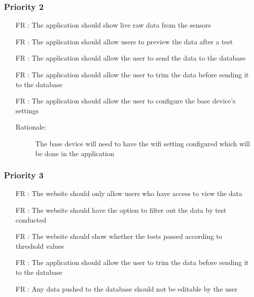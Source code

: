 \documentclass[12pt]{article}
\newcounter{reqnum} %
\begin{document}
\subsubsection{Priority 2}
\begin{itemize}
  \item[FR \refstepcounter{reqnum}\thereqnum:] The application should show live raw data from the sensors
  
  
  
  \item[FR \refstepcounter{reqnum}\thereqnum:] The application should allow users to preview the data after a test
  
  \item[FR \refstepcounter{reqnum}\thereqnum:] The application should allow the user to send the data to the database
  
  \item[FR \refstepcounter{reqnum}\thereqnum:] The application should allow the user to trim the data before sending it to the database
  
  \item[FR \refstepcounter{reqnum}\thereqnum:] The application should allow the user to configure the base device's settings
  \begin{description} \item[Rationale:] The base device will need to have the wifi setting configured which will be done in the application \end{description}
  
  \end{itemize}

\subsubsection{Priority 3}
\begin{itemize}
  \item[FR \refstepcounter{reqnum}\thereqnum:] The website should only allow users who have access to view the data
  
  \item[FR \refstepcounter{reqnum}\thereqnum:] The website should have the option to filter out the data by test conducted
  
  \item[FR \refstepcounter{reqnum}\thereqnum:] The website should show whether the tests passed according to threshold values
  
  \item[FR \refstepcounter{reqnum}\thereqnum:] The application should allow the user to trim the data before sending it to the database
  
  \item[FR \refstepcounter{reqnum}\thereqnum:] Any data pushed to the database should not be editable by the user
  
  \end{itemize}
\end{document}
